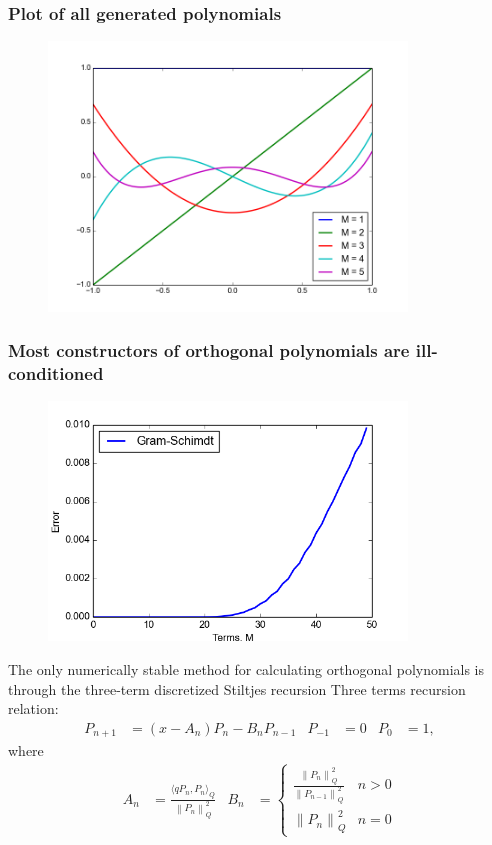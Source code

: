 \documentclass{beamer}
\newcommand{\norm}[1]{\left\lVert#1\right\rVert_{\!Q}}
\begin{document}
\begin{frame}
 \frametitle{Plot of all generated polynomials}
  \begin{figure}
    \includegraphics[width=0.85\textwidth]{gramschmidtpoly.png}
  \end{figure}
\end{frame}


\begin{frame}
 \frametitle{Most constructors of orthogonal polynomials are
 ill-conditioned}
     \begin{figure}
    \includegraphics[width=0.85\textwidth]{gramschmidterror1.png}
  \end{figure}

 \end{frame}


\begin{frame}
 {The only numerically stable method for
 calculating orthogonal polynomials is through the three-term discretized
 Stiltjes recursion}
 \pause
 Three terms recursion relation:
 \begin{align*}
     P_{n+1} &= (x-A_n) P_n - B_n P_{n-1} &
     P_{-1} &= 0 & P_0 &= 1,
 \end{align*}
    \pause
   where
   \begin{align*}
   A_n &= \frac{\langle qP_n,P_n\rangle_Q}{\norm{P_n}^2}
   &
  B_n &=
  \begin{cases}
  \frac{\norm{P_n}^2}{\norm{P_{n-1}}^2} & n > 0\\
  \norm{P_n}^2 & n = 0
  \end{cases}
   \end{align*}
  \end{frame}
\end{document}
